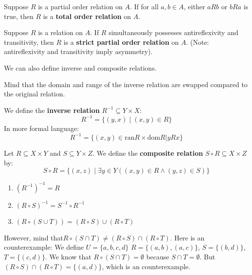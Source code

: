 \documentclass[oneside]{book}
\begin{document}
\begin{definition}
Suppose $R$ is a partial order relation on $A$. If for all $a, b \in A$, either $aRb$ or $bRa$ is true, then $R$ is a \textbf{total order relation} on $A$.
\end{definition}

\begin{definition}
Suppose $R$ is a relation on $A$. If $R$ simultaneously possesses antireflexivity and transitivity, then $R$ is a \textbf{strict partial order relation} on $A$. (Note: antireflexivity and transitivity imply asymmetry).
\end{definition}

We can also define inverse and composite relations.

Mind that the domain and range of the inverse relation are swapped compared to the original relation.

\begin{definition}
We define the \textbf{inverse relation} $R^{-1} \subseteq Y \times X$:
$$ R^{-1} = \{ (y,x) \mid (x,y) \in R \} $$
In more formal language:
\[
R^{-1} = \{(x,y) \in \text{ran}R \times \text{dom}R | yRx\}
\]
\end{definition}

\begin{definition}
Let $R \subseteq X \times Y$ and $S \subseteq Y \times Z$. We define the \textbf{composite relation} $S \circ R \subseteq X \times Z$ by:
$$ S \circ R = \{ (x,z) \mid \exists y \in Y ((x,y) \in R \wedge (y,z) \in S) \} $$
\end{definition}
\begin{theorem}
\begin{enumerate}
    \item $(R^{-1})^{-1} = R$
    \item $(R \circ S)^{-1} = S^{-1} \circ R^{-1}$
    \item $(R \circ (S \cup T)) = (R \circ S) \cup (R \circ T)$
\end{enumerate}
\end{theorem}
However, mind that$R \circ (S \cap T) \neq (R \circ S) \cap (R \circ T)$.
Here is an counterexample:
We define $U=\{a,b,c,d\}$ $R=\{(a,b),(a,c)\}$, $S=\{(b,d)\}$, $T=\{(c,d)\}$.
We know that $R \circ (S \cap T)  = \emptyset$ because $S \cap T = \emptyset$. But $(R \circ S) \cap (R \circ T) = \{(a,d)\}$, which is an counterexample.
\end{document}
